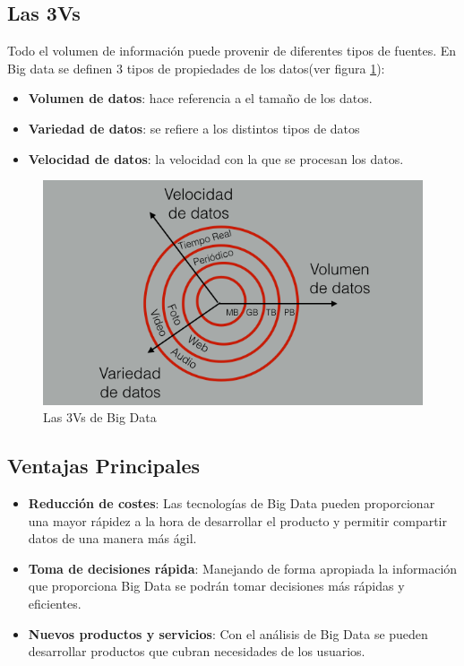 \subsection{Las 3Vs}

Todo el volumen de información puede provenir de diferentes tipos de fuentes. En Big data se definen 3 tipos de propiedades de los datos(ver figura \ref{3vs}):

\begin{itemize}

\item \textbf{Volumen de datos}: hace referencia a el tamaño de los datos.

\item \textbf{Variedad de datos}: se refiere a los distintos tipos de datos

\item \textbf{Velocidad de datos}: la velocidad con la que se procesan los datos.

\end{itemize}

\begin{figure}
\begin{center}
\includegraphics[width=1.0\textwidth]{imagenes/3V.png}
\caption{Las 3Vs de Big Data}
\label{3vs}
\end{center}
\end{figure}

\subsection{Ventajas Principales}


\begin{itemize}
  \item \textbf{Reducción de costes}: Las tecnologías de Big Data pueden proporcionar una mayor rápidez a la hora de desarrollar el producto y permitir compartir datos de una manera más ágil.
  
  \item \textbf{Toma de decisiones rápida}: Manejando de forma apropiada la información que proporciona Big Data se podrán tomar 
  decisiones más rápidas y eficientes.
  
  \item \textbf{Nuevos productos y servicios}: Con el análisis de Big Data se pueden desarrollar productos que cubran necesidades de los usuarios.
  
\end{itemize}

